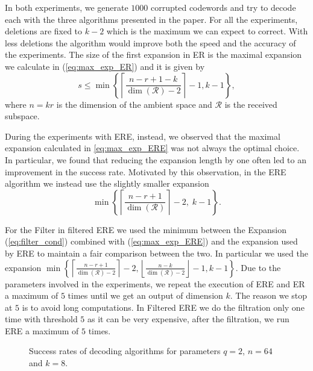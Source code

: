 \documentclass{article}
\newcommand{\calR}{\mathcal{R}}
\begin{document}
In both experiments, we generate $1000$ corrupted codewords and try to decode each with the three algorithms presented in the paper.
For all the experiments, deletions are fixed to $k-2$ which is the maximum we can expect to correct.
With less deletions the algorithm would improve both the speed and the accuracy of the experiments.
The size of the first expansion in ER is the maximal expansion we calculate in (\ref{eq:max_exp_ER}) and it is given by
$$s \leq\min \left \{\left\lceil \frac{n-r+1-k}{\dim(\calR)-2} \right \rceil - 1,k-1 \right\},$$
where $n=kr$ is the dimension of the ambient space and $\calR$ is the received subspace. 

During the experiments with ERE, instead, we observed that the maximal expansion calculated in \eqref{eq:max_exp_ERE} was not always the optimal choice.
In particular, we found that reducing the expansion length by one often led to an improvement in the success rate.
Motivated by this observation, in the ERE algorithm we instead use the slightly smaller expansion
\[
\min\left\{\left\lceil \frac{n-r+1}{\dim(\mathcal{R})} \right\rceil - 2,\; k-1\right\}.
\]

For the Filter in filtered ERE we used the minimum between the Expansion
(\ref{eq:filter_cond}) combined with (\ref{eq:max_exp_ERE}) and the expansion used by ERE to maintain a fair comparison between the two.
In particular we used the expansion
 $\min\left\{\left\lceil \frac{n - r + 1}{\dim(\mathcal{R})-2} \right\rceil - 2, \left\lfloor \frac{n-k}{\dim(\calR)-2} \right\rfloor - 1 ,k-1\right\}.$
Due to the parameters involved in the experiments, we repeat the execution of ERE and ER a maximum of $5$ times until we get an output of dimension $k$.
The reason we stop at $5$ is to avoid long computations.
In Filtered ERE we do the filtration only one time with threshold $5$ as it can be very expensive, after the filtration, we run ERE a maximum of $5$ times.

\begin{figure}[H]
\caption{
Success rates of decoding algorithms for parameters $q=2$, $n=64$ and $k=8$.
}
\label{fig:88_graph}
\end{figure}
\end{document}
